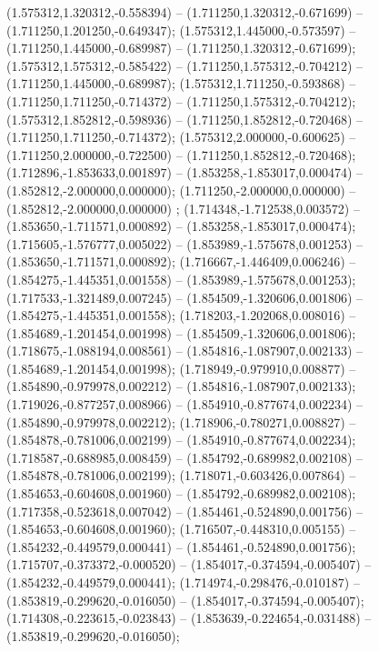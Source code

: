  (1.575312,1.320312,-0.558394) -- (1.711250,1.320312,-0.671699) -- (1.711250,1.201250,-0.649347);
 (1.575312,1.445000,-0.573597) -- (1.711250,1.445000,-0.689987) -- (1.711250,1.320312,-0.671699);
 (1.575312,1.575312,-0.585422) -- (1.711250,1.575312,-0.704212) -- (1.711250,1.445000,-0.689987);
 (1.575312,1.711250,-0.593868) -- (1.711250,1.711250,-0.714372) -- (1.711250,1.575312,-0.704212);
 (1.575312,1.852812,-0.598936) -- (1.711250,1.852812,-0.720468) -- (1.711250,1.711250,-0.714372);
 (1.575312,2.000000,-0.600625) -- (1.711250,2.000000,-0.722500) -- (1.711250,1.852812,-0.720468);
 (1.712896,-1.853633,0.001897) -- (1.853258,-1.853017,0.000474) -- (1.852812,-2.000000,0.000000);
 (1.711250,-2.000000,0.000000) -- (1.852812,-2.000000,0.000000) ;
 (1.714348,-1.712538,0.003572) -- (1.853650,-1.711571,0.000892) -- (1.853258,-1.853017,0.000474);
 (1.715605,-1.576777,0.005022) -- (1.853989,-1.575678,0.001253) -- (1.853650,-1.711571,0.000892);
 (1.716667,-1.446409,0.006246) -- (1.854275,-1.445351,0.001558) -- (1.853989,-1.575678,0.001253);
 (1.717533,-1.321489,0.007245) -- (1.854509,-1.320606,0.001806) -- (1.854275,-1.445351,0.001558);
 (1.718203,-1.202068,0.008016) -- (1.854689,-1.201454,0.001998) -- (1.854509,-1.320606,0.001806);
 (1.718675,-1.088194,0.008561) -- (1.854816,-1.087907,0.002133) -- (1.854689,-1.201454,0.001998);
 (1.718949,-0.979910,0.008877) -- (1.854890,-0.979978,0.002212) -- (1.854816,-1.087907,0.002133);
 (1.719026,-0.877257,0.008966) -- (1.854910,-0.877674,0.002234) -- (1.854890,-0.979978,0.002212);
 (1.718906,-0.780271,0.008827) -- (1.854878,-0.781006,0.002199) -- (1.854910,-0.877674,0.002234);
 (1.718587,-0.688985,0.008459) -- (1.854792,-0.689982,0.002108) -- (1.854878,-0.781006,0.002199);
 (1.718071,-0.603426,0.007864) -- (1.854653,-0.604608,0.001960) -- (1.854792,-0.689982,0.002108);
 (1.717358,-0.523618,0.007042) -- (1.854461,-0.524890,0.001756) -- (1.854653,-0.604608,0.001960);
 (1.716507,-0.448310,0.005155) -- (1.854232,-0.449579,0.000441) -- (1.854461,-0.524890,0.001756);
 (1.715707,-0.373372,-0.000520) -- (1.854017,-0.374594,-0.005407) -- (1.854232,-0.449579,0.000441);
 (1.714974,-0.298476,-0.010187) -- (1.853819,-0.299620,-0.016050) -- (1.854017,-0.374594,-0.005407);
 (1.714308,-0.223615,-0.023843) -- (1.853639,-0.224654,-0.031488) -- (1.853819,-0.299620,-0.016050);
